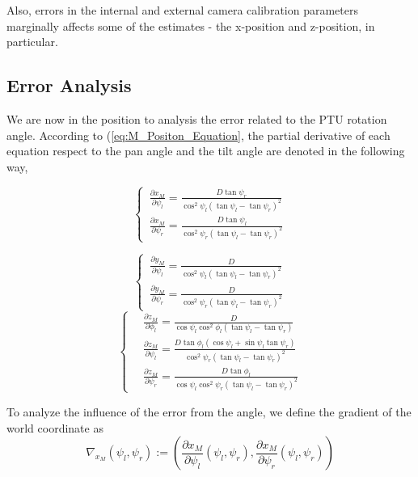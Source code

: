 \documentclass[journal,article,submit,moreauthors,pdftex,10pt,a4paper]{mdpi}
\begin{document}
Also, errors in the internal and external camera calibration parameters marginally affects some of the estimates - the x-position and z-position, in particular.

\subsection{Error Analysis}
We are now in the position to analysis the error related to the PTU rotation angle. According to (\ref{eq:M_Positon_Equation}, the partial derivative of each equation respect to the pan angle and the tilt angle are denoted in the following way,

\begin{equation}
	\left\{ \,
	\begin{aligned}
		\frac{ \partial x_M}{ \partial \psi_l} = \frac{D \tan \psi_r}{ \cos^2 \psi_l (\tan \psi_l - \tan \psi_r)^2} \\
		\frac{ \partial x_M}{\partial \psi_r} = \frac{D \tan \psi_l}{\cos^2 \psi_r (\tan \psi_l - \tan \psi_r)^2} 
	\end{aligned}
	\right.
\end{equation}

\begin{equation}
	\left\{ \,
	\begin{aligned}
		\frac{\partial y_M}{\partial \psi_l} = \frac{ D}{\cos^2 \psi_l (\tan \psi_l - \tan \psi_r)^2} \\
		\frac{\partial y_M}{\partial \psi_r} = \frac{D}{\cos^2 \psi_r (\tan \psi_l - \tan \psi_r)^2} 
	\end{aligned}
	\right.	
\end{equation}
\begin{equation}
	\left\{ \,
	\begin{aligned}
		&\frac{ \partial z_M}{ \partial \phi_l} = \frac{D}{ \cos \psi_l \cos^2 \phi_l (\tan \psi_l - \tan \psi_r)} \\
		&\frac{\partial z_M}{\partial \psi_l} = \frac{ D \tan \phi_l(\cos \psi_l + \sin \psi_l \tan \psi_r)}{ \cos^2 \psi_r (\tan \psi_l - \tan \psi_r)^2} \\
		&\frac{ \partial z_M}{ \partial \psi_r} = \frac{ D \tan \phi_l}{ \cos \psi_l \cos^2 \psi_r (\tan \psi_l - \tan \psi_r)^2}
	\end{aligned}
	\right.
\end{equation} 

To analyze the influence of the error from the angle, we define the gradient of the world coordinate as
\begin{equation}
	\nabla_{x_M}(\psi_l, \psi_r):=\left( \frac{\partial x_M}{\partial \psi_l}(\psi_l, \psi_r), \frac{\partial x_M}{\partial \psi_r}(\psi_l, \psi_r)  \right)
\end{equation}
\end{document}
